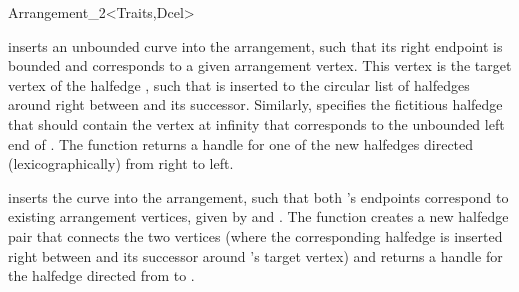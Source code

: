 \begin{ccRefClass}{Arrangement_2<Traits,Dcel>}
\begin{ccAdvanced}
  {inserts an unbounded curve  into the arrangement, such that its right
   endpoint is bounded and corresponds to a given arrangement vertex. This
   vertex is the target vertex of the halfedge , such that 
   is inserted to the circular list of halfedges around 
   right between  and its successor. Similarly, 
   specifies the fictitious halfedge that should contain the vertex at infinity
   that corresponds to the unbounded left end of .
   The function returns a handle for one of the new halfedges directed
   (lexicographically) from right to left.
   }

  {inserts the curve  into the arrangement, such that both 's
   endpoints correspond to existing arrangement vertices, given by
    and . The function creates a new halfedge
   pair that connects the two vertices (where the corresponding halfedge is
   inserted right between  and its successor around 's
   target vertex) and returns a handle for the halfedge directed from
    to .
   }


\end{ccAdvanced}
\end{ccRefClass}
